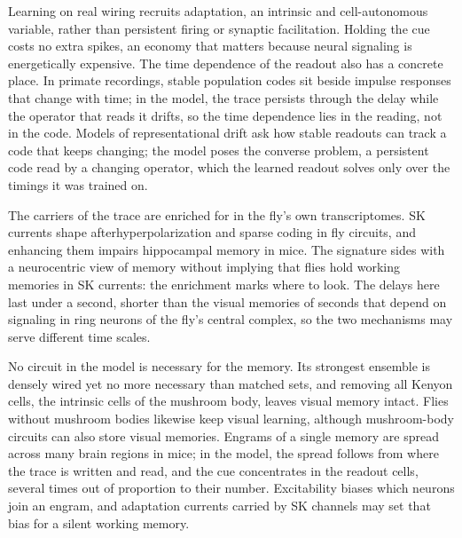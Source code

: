 Learning on real wiring recruits adaptation, an intrinsic and cell-autonomous variable, rather than persistent firing or
synaptic facilitation. Holding the cue costs no extra spikes, an economy that matters
because neural signaling is energetically expensive. The time dependence of the readout also has a concrete
place. In primate recordings, stable population codes sit beside impulse responses that change with
time; in the model, the trace persists through the delay while the operator that reads it drifts,
so the time dependence lies in the reading, not in the code. Models of representational drift ask how stable readouts can track
a code that keeps changing; the model poses the converse problem, a persistent code read by a changing
operator, which the learned readout solves only over the timings it was trained on.

The carriers of the trace are enriched for  in the fly's own transcriptomes. SK currents shape afterhyperpolarization
and sparse coding in fly circuits, and enhancing them impairs hippocampal memory in mice.
The signature sides with a neurocentric view of memory without implying that flies hold working memories in
SK currents: the enrichment marks where to look. The delays here last under a second, shorter than the visual memories of
seconds that depend on signaling in ring neurons of the fly's central complex, so the two
mechanisms may serve different time scales.

No circuit in the model is necessary for the memory. Its strongest ensemble is densely wired yet no more necessary than matched
sets, and removing all Kenyon cells, the intrinsic cells of the mushroom body, leaves visual memory intact. Flies without
mushroom bodies likewise keep visual learning, although mushroom-body circuits can also store visual
memories. Engrams of a single memory are spread across many brain regions in mice; in the
model, the spread follows from where the trace is written and read, and the cue concentrates in the readout cells, several times
out of proportion to their number. Excitability biases which neurons join an engram, and
adaptation currents carried by SK channels may set that bias for a silent working memory.

